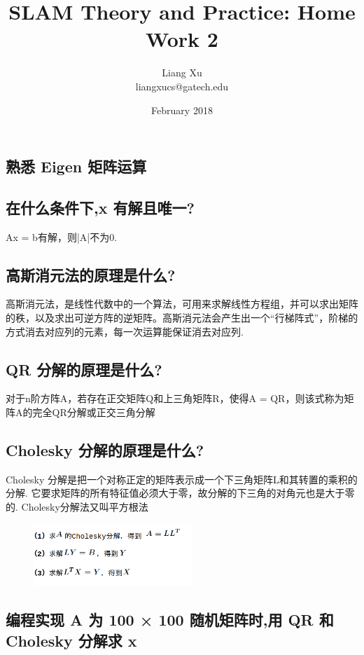 \documentclass{article}
\title{SLAM Theory and Practice: Home Work 2}
\author{Liang Xu \\ liangxucs@gatech.edu}
\date{February 2018}
\begin{document}
\begin{CJK*}{UTF8}{gbsn}
\maketitle

\section{熟悉 Eigen 矩阵运算}
\subsection{在什么条件下,x 有解且唯一?}
Ax = b有解，则|A|不为0. 

\subsection{高斯消元法的原理是什么?}
高斯消元法，是线性代数中的一个算法，可用来求解线性方程组，并可以求出矩阵的秩，以及求出可逆方阵的逆矩阵。高斯消元法会产生出一个“行梯阵式”，阶梯的方式消去对应列的元素，每一次运算能保证消去对应列. 

\subsection{QR 分解的原理是什么?}
对于n阶方阵A，若存在正交矩阵Q和上三角矩阵R，使得A = QR，则该式称为矩阵A的完全QR分解或正交三角分解
\subsection{Cholesky 分解的原理是什么?}
Cholesky 分解是把一个对称正定的矩阵表示成一个下三角矩阵L和其转置的乘积的分解. 它要求矩阵的所有特征值必须大于零，故分解的下三角的对角元也是大于零的. Cholesky分解法又叫平方根法
\begin{figure}[h]
	\includegraphics[width=6cm]{cho.png}
	\centering
\end{figure}
\subsection{编程实现 A 为 100 × 100 随机矩阵时,用 QR 和 Cholesky 分解求 x }


\clearpage\end{CJK*}
\end{document}
